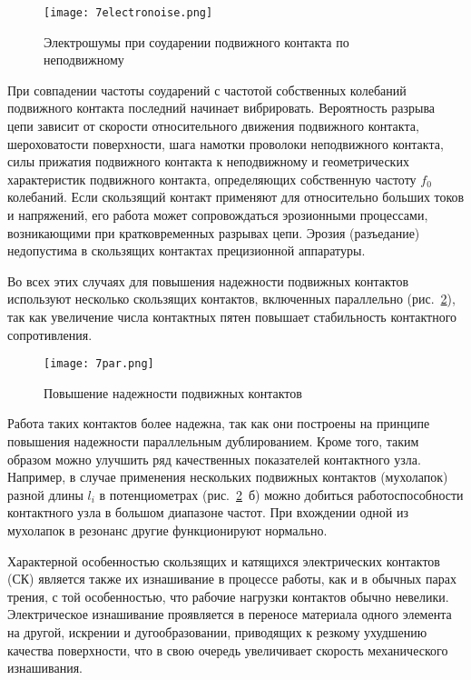 \begin{figure}[h!]
	\caption{ Электрошумы при соударении подвижного контакта по неподвижному }
	\texttt{[image: 7electronoise.png]}
	\label{pic:7electronoise}
\end{figure}

При совпадении частоты соударений с частотой собственных колебаний подвижного контакта последний начинает вибрировать. Вероятность разрыва цепи зависит от скорости относительного движения подвижного контакта, шероховатости поверхности, шага намотки проволоки неподвижного контакта, силы прижатия подвижного контакта к неподвижному и геометрических характеристик подвижного контакта, определяющих собственную частоту $ f_0 $ колебаний. Если скользящий контакт применяют для относительно больших токов и напряжений, его работа может сопровождаться эрозионными процессами, возникающими при кратковременных разрывах цепи. Эрозия (разъедание) недопустима в скользящих контактах прецизионной аппаратуры. 

Во всех этих случаях для повышения надежности подвижных контактов используют несколько скользящих контактов, включенных параллельно (рис.~\ref{pic:7par}), так как увеличение числа контактных пятен повышает стабильность контактного сопротивления.

\begin{figure}[h!]
	\caption{ Повышение надежности подвижных контактов }
	\texttt{[image: 7par.png]}
	\label{pic:7par}
\end{figure}

Работа таких контактов более надежна, так как они построены на принципе повышения надежности параллельным дублированием. Кроме того, таким образом можно улучшить ряд качественных показателей контактного узла. Например, в случае применения нескольких подвижных контактов (мухолапок) разной длины $ l_i $ в потенциометрах (рис.~\ref{pic:7par}~б) можно добиться работоспособности контактного узла в большом диапазоне частот. При вхождении одной из мухолапок в резонанс другие функционируют нормально.

Характерной особенностью скользящих и катящихся электрических контактов (СК) является также их изнашивание в процессе работы, как и в обычных парах трения, с той особенностью, что рабочие нагрузки контактов обычно невелики. Электрическое изнашивание проявляется в переносе материала одного элемента на другой, искрении и дугообразовании, приводящих к резкому ухудшению качества поверхности, что в свою очередь увеличивает скорость механического изнашивания.

